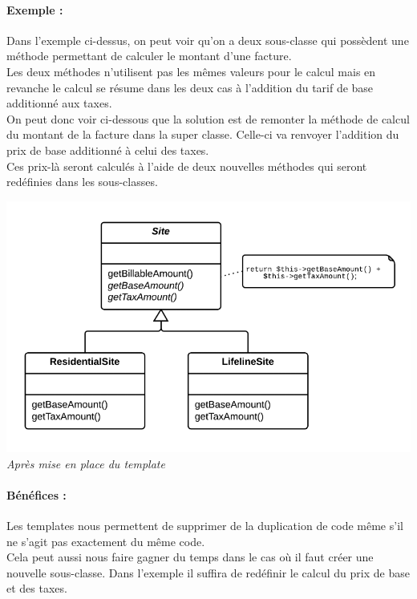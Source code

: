 \documentclass[a4paper,twoside,12pt,openright]{report}
\begin{document}
\paragraph{Exemple :}
Dans l'exemple ci-dessus, on peut voir qu'on a deux sous-classe qui possèdent une méthode permettant de calculer le montant d'une facture.\\
Les deux méthodes n'utilisent pas les mêmes valeurs pour le calcul mais en revanche le calcul se résume dans les deux cas à l'addition du tarif de base additionné aux taxes.\\
On peut donc voir ci-dessous que la solution est de remonter la méthode de calcul du montant de la facture dans la super classe. Celle-ci va renvoyer l'addition du prix de base additionné à celui des taxes.\\
Ces prix-là seront calculés à l'aide de deux nouvelles méthodes qui seront redéfinies dans les sous-classes.\\

\begin{center}
\includegraphics[scale=0.75]{Image/Template2.png}\\
\itshape{Après mise en place du template \cite{ref5}}
\end{center}

\paragraph{Bénéfices :}
Les templates nous permettent de supprimer de la duplication de code même s'il ne s'agit pas exactement du même code.\\
Cela peut aussi nous faire gagner du temps dans le cas où il faut créer une nouvelle sous-classe. Dans l'exemple il suffira de redéfinir le calcul du prix de base et des taxes.\\
\end{document}
